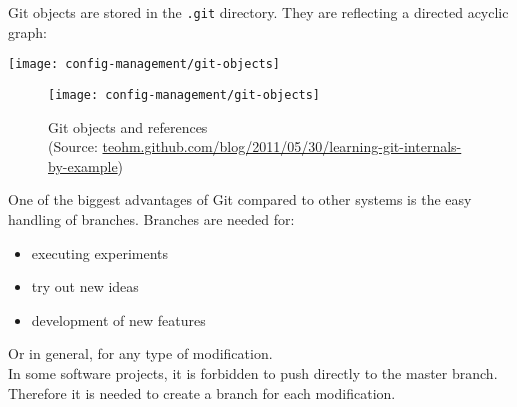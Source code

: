 \newslide
Git objects are stored in the \verb|.git| directory. They are reflecting a
directed acyclic graph:
\ifslides
\begin{center}
  \texttt{[image: config-management/git-objects]}
\end{center}
\else
\begin{figure}[H]
  \centering
  \texttt{[image: config-management/git-objects]}
  \caption[Git-Objekte und Referenzen]{Git objects and references \\
(Source: \href{http://teohm.github.com/blog/2011/05/30/learning-git-internals-by-example}
                {teohm.github.com/blog/2011/05/30/learning-git-internals-by-example})}
  \label{fig:gitobjects}
\end{figure}
\fi
\newslide
One of the biggest advantages of Git compared to other systems is the easy
handling of branches. Branches are needed for:
\begin{itemize}
\item executing experiments
\item try out new ideas
\item development of new features
\end{itemize}
Or in general, for any type of modification.\\
In some software projects, it is forbidden to push directly to the master
branch. Therefore it is needed to create a branch for each modification.
%
\newslide
\newpage
